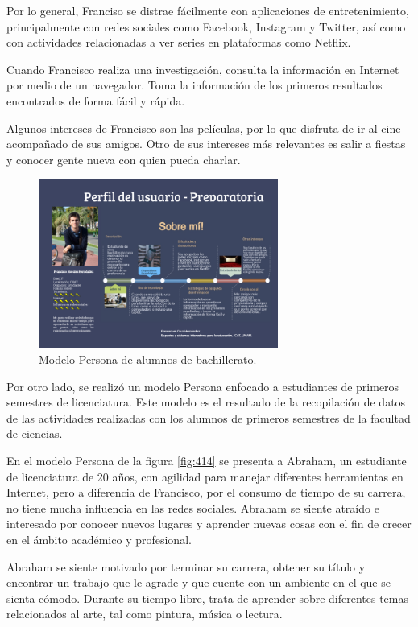 Por lo general, Franciso se distrae fácilmente con aplicaciones de entretenimiento, principalmente con redes sociales como Facebook, Instagram y Twitter, así como con actividades relacionadas a ver series en plataformas como Netflix.

Cuando Francisco realiza una investigación, consulta la información en Internet por medio de un navegador. Toma la información de los primeros resultados encontrados de forma fácil y rápida.

Algunos intereses de Francisco son las películas, por lo que disfruta de ir al cine acompañado de sus amigos. Otro de sus intereses más relevantes es salir a fiestas y conocer gente nueva con quien pueda charlar.

\begin{figure}
  \centering
  \includegraphics[width=0.70\textwidth]{Cap4/Figuras/Prepa.png}
  \caption{Modelo Persona de alumnos de bachillerato.}
  \label{fig:413}
\end{figure}

Por otro lado, se realizó un modelo Persona enfocado a estudiantes de primeros semestres de licenciatura. Este modelo es el resultado de la recopilación de datos de las actividades realizadas con los alumnos de primeros semestres de la facultad de ciencias.

En el modelo Persona de la figura \ref{fig:414} se presenta a Abraham, un estudiante de licenciatura de 20 años, con agilidad para manejar diferentes herramientas en Internet, pero a diferencia de Francisco, por el consumo de tiempo de su carrera, no tiene mucha influencia en las redes sociales. Abraham se siente atraído e interesado por conocer nuevos lugares y aprender nuevas cosas con el fin de crecer en el ámbito académico y profesional.

Abraham se siente motivado por terminar su carrera, obtener su título y encontrar un trabajo que le agrade y que cuente con un ambiente en el que se sienta cómodo. Durante su tiempo libre, trata de aprender sobre diferentes temas relacionados al arte, tal como pintura, música o lectura.

